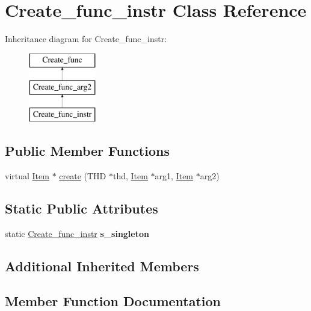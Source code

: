 \hypertarget{classCreate__func__instr}{}\section{Create\+\_\+func\+\_\+instr Class Reference}
\label{classCreate__func__instr}
Inheritance diagram for Create\+\_\+func\+\_\+instr\+:\begin{figure}[H]
\begin{center}
\leavevmode
\includegraphics[height=3.000000cm]{classCreate__func__instr}
\end{center}
\end{figure}
\subsection*{Public Member Functions}
\begin{DoxyCompactItemize}
\item 
virtual \mbox{\hyperlink{classItem}{Item}} $\ast$ \mbox{\hyperlink{classCreate__func__instr_a59187c9ca2750acb5c24c2e6513c5340}{create}} (T\+HD $\ast$thd, \mbox{\hyperlink{classItem}{Item}} $\ast$arg1, \mbox{\hyperlink{classItem}{Item}} $\ast$arg2)
\end{DoxyCompactItemize}
\subsection*{Static Public Attributes}
\begin{DoxyCompactItemize}
\item 
\mbox{\label{classCreate__func__instr_a67f157ba1806dac86047823f36e4fadd}} 
static \mbox{\hyperlink{classCreate__func__instr}{Create\+\_\+func\+\_\+instr}} {\bfseries s\+\_\+singleton}
\end{DoxyCompactItemize}
\subsection*{Additional Inherited Members}


\subsection{Member Function Documentation}
\mbox{\label{classCreate__func__instr_a59187c9ca2750acb5c24c2e6513c5340}} 
